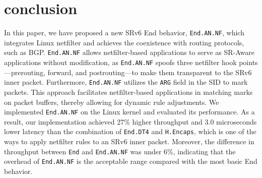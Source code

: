 \chapter{conclusion}
\label{chap:conclusion}
In this paper, we have proposed a new SRv6 End behavior, \texttt{End.AN.NF}, which integrates Linux netfilter and achieves the coexistence with routing protocols, such as BGP.
\sloppy \texttt{End.AN.NF} allows netfilter-based applications to serve as SR-Aware applications without modification, as \texttt{End.AN.NF} spoofs three netfilter hook points---prerouting, forward, and postrouting---to make them transparent to the SRv6 inner packet.
Furthermore, \texttt{End.AN.NF} utilizes the \texttt{ARG} field in the SID to mark packets.
This approach facilitates netfilter-based applications in matching marks on packet buffers, thereby allowing for dynamic rule adjustments.
We implemented \texttt{End.AN.NF} on the Linux kernel and evaluated its performance.
As a result, our implementation achieved 27\% higher throughput and 3.0 microseconds lower latency than the combination of \texttt{End.DT4} and \texttt{H.Encaps}, which is one of the ways to apply netfilter rules to an SRv6 inner packet.
Moreover, the difference in throughput between \texttt{End} and \texttt{End.AN.NF} was under 6\%, indicating that the overhead of \texttt{End.AN.NF} is the acceptable range compared with the most basic End behavior.
